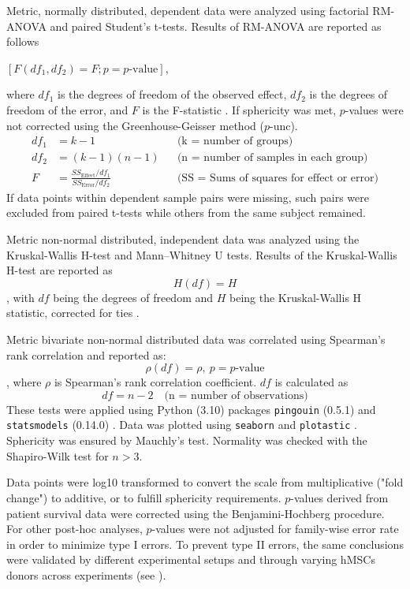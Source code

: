 Metric, normally distributed, dependent data were analyzed using factorial
RM-ANOVA and paired Student's t-tests. Results of RM-ANOVA are reported as
follows
\begin{center}
    \([F(df_1, df_2) = F; p = p\text{-value}]\),
\end{center}
where \(df_1\) is the degrees of freedom of the observed effect, \(df_2\) is the
degrees of freedom of the error, and \(F\) is the F-statistic
\cite{vallatPingouinStatisticsPython2018}. If sphericity was met, \(p\)-values
were not corrected using the Greenhouse-Geisser method (\(p\)-unc).
\begin{align*}
    df_1 & = k - 1                                                      &  & \text{(k = number of groups)}                     \\
    df_2 & = (k - 1)(n - 1)                                             &  & \text{(n = number of samples in each group)}      \\
    F    & = \frac{SS_{\text{Effect}} / df_1}{SS_{\text{Error}} / df_2} &  & \text{(SS = Sums of squares for effect or error)}
\end{align*}
If data points within dependent sample pairs were missing, such pairs were
excluded from paired t-tests while others from the same subject remained.

Metric non-normal distributed, independent data was analyzed using the
Kruskal-Wallis H-test and Mann–Whitney U tests. Results of the Kruskal-Wallis
H-test are reported as
\[H(df) = H\], with \(df\) being the degrees of freedom
and \(H\) being the Kruskal-Wallis H statistic, corrected for ties
\cite{vallatPingouinStatisticsPython2018}.

Metric bivariate non-normal distributed data was correlated using Spearman's
rank correlation and reported as: \[\rho (df) = \rho, \ p = p\text{-value}\],
where \(\rho\) is Spearman's rank correlation coefficient. \(df\) is calculated
as
\[
    df = n - 2 \quad \text{(n = number of observations)}
\]
These tests were applied using Python (3.10) packages \texttt{pingouin} (0.5.1)
and \texttt{statsmodels} (0.14.0)
\cite{seaboldStatsmodelsEconometricStatistical2010,vallatPingouinStatisticsPython2018}. Data was plotted
using \texttt{seaborn} \cite{waskomSeabornStatisticalData2021} and \texttt{plotastic}
\cite{kuricPlotasticBridgingPlotting2024}. Sphericity was ensured by Mauchly's
test. Normality was checked with the Shapiro-Wilk test for \(n > 3\).

Data points were log10 transformed to convert the scale from multiplicative
("fold change") to additive, or to fulfill sphericity requirements. \(p\)-values
derived from patient survival data were corrected using the Benjamini-Hochberg
procedure. For other post-hoc analyses, \(p\)-values were not adjusted for
family-wise error rate in order to minimize type I errors. To prevent type II
errors, the same conclusions were validated by different experimental setups and
through varying hMSCs donors across experiments (see ).

